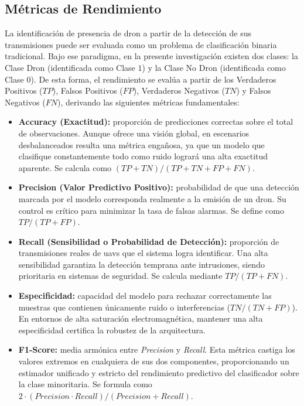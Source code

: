 \subsection{Métricas de Rendimiento}
\label{subsec:eval_metricas}
La identificación de presencia de dron a partir de la detección de sus transmisiones puede ser evaluada como un problema de clasificación binaria tradicional. Bajo ese paradigma, en la presente investigación existen dos clases: la Clase Dron (identificada como Clase $1$) y la Clase No Dron (identificada como Clase $0$). De esta forma, el rendimiento se evalúa a partir de los Verdaderos Positivos ($TP$), Falsos Positivos ($FP$), Verdaderos Negativos ($TN$) y Falsos Negativos ($FN$), derivando las siguientes métricas fundamentales:
\begin{itemize}
    \item \textbf{Accuracy (Exactitud):} proporción de predicciones correctas sobre el total de observaciones. Aunque ofrece una visión global, en escenarios desbalanceados resulta una métrica engañosa, ya que un modelo que clasifique constantemente todo como ruido logrará una alta exactitud aparente. Se calcula como $(TP + TN) / (TP + TN + FP + FN)$.
    
    \item \textbf{Precision (Valor Predictivo Positivo):} probabilidad de que una detección marcada por el modelo corresponda realmente a la emisión de un dron. Su control es crítico para minimizar la tasa de falsas alarmas. Se define como $TP / (TP + FP)$.
    
    \item \textbf{Recall (Sensibilidad o Probabilidad de Detección):} proporción de transmisiones reales de \gls{uav}s que el sistema logra identificar. Una alta sensibilidad garantiza la detección temprana ante intrusiones, siendo prioritaria en sistemas de seguridad. Se calcula mediante $TP / (TP + FN)$.
    
    \item \textbf{Especificidad:} capacidad del modelo para rechazar correctamente las muestras que contienen únicamente ruido o interferencias ($TN / (TN + FP)$). En entornos de alta saturación electromagnética, mantener una alta especificidad certifica la robustez de la arquitectura.
    
    \item \textbf{F1-Score:} media armónica entre \textit{Precision} y \textit{Recall}. Esta métrica castiga los valores extremos en cualquiera de sus dos componentes, proporcionando un estimador unificado y estricto del rendimiento predictivo del clasificador sobre la clase minoritaria. Se formula como $2 \cdot (Precision \cdot Recall) / (Precision + Recall)$.
\end{itemize}

